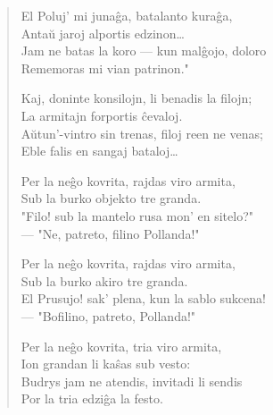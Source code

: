 \begin{verse}
               El Poluj' mi juna\^ga, batalanto kura\^ga,\\
               \vin  Anta\u u jaroj alportis edzinon\dots\\
               Jam ne batas la koro --- kun mal\^gojo, doloro\\
               \vin  Rememoras mi vian patrinon."

               Kaj, doninte konsilojn, li benadis la filojn;\\
              \vin   La armitajn forportis \^cevaloj.\\
               A\u utun'-vintro sin trenas, filoj reen ne venas;\\
               \vin  Eble falis en sangaj bataloj\dots

               Per la ne\^go kovrita, rajdas viro armita,\\
              \vin   Sub la burko objekto tre granda.\\
               "Filo! sub la mantelo rusa mon' en sitelo?"\\
              \vin --- "Ne, patreto, filino Pollanda!"

               Per la ne\^go kovrita, rajdas viro armita,\\
               \vin  Sub la burko akiro tre granda.\\
               El Prusujo! sak' plena, kun la sablo sukcena!\\
              \vin --- "Bofilino, patreto, Pollanda!"

               Per la ne\^go kovrita, tria viro armita,\\
               \vin  Ion grandan li ka\^sas sub vesto:\\
               Budrys jam ne atendis, invitadi li sendis\\
               \vin  Por la tria edzi\^ga la festo.

\end{verse}


\smallrule{}

